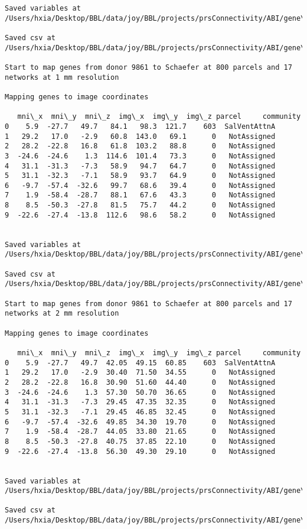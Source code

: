 \documentclass[11pt]{article}
\begin{document}
\begin{Verbatim}[commandchars=\\\{\}]
Saved variables at /Users/hxia/Desktop/BBL/data/joy/BBL/projects/prsConnectivity/ABI/gene\_mapping/9861donor\_800Parcels\_7Network\_2mm.pkl

Saved csv at /Users/hxia/Desktop/BBL/data/joy/BBL/projects/prsConnectivity/ABI/gene\_mapping/9861donor\_800Parcels\_7Network\_2mm.csv

Start to map genes from donor 9861 to Schaefer at 800 parcels and 17 networks at 1 mm resolution

Mapping genes to image coordinates

   mni\_x  mni\_y  mni\_z  img\_x  img\_y  img\_z parcel     community
0    5.9  -27.7   49.7   84.1   98.3  121.7    603  SalVentAttnA
1   29.2   17.0   -2.9   60.8  143.0   69.1      0   NotAssigned
2   28.2  -22.8   16.8   61.8  103.2   88.8      0   NotAssigned
3  -24.6  -24.6    1.3  114.6  101.4   73.3      0   NotAssigned
4   31.1  -31.3   -7.3   58.9   94.7   64.7      0   NotAssigned
5   31.1  -32.3   -7.1   58.9   93.7   64.9      0   NotAssigned
6   -9.7  -57.4  -32.6   99.7   68.6   39.4      0   NotAssigned
7    1.9  -58.4  -28.7   88.1   67.6   43.3      0   NotAssigned
8    8.5  -50.3  -27.8   81.5   75.7   44.2      0   NotAssigned
9  -22.6  -27.4  -13.8  112.6   98.6   58.2      0   NotAssigned


Saved variables at /Users/hxia/Desktop/BBL/data/joy/BBL/projects/prsConnectivity/ABI/gene\_mapping/9861donor\_800Parcels\_17Network\_1mm.pkl

Saved csv at /Users/hxia/Desktop/BBL/data/joy/BBL/projects/prsConnectivity/ABI/gene\_mapping/9861donor\_800Parcels\_17Network\_1mm.csv

Start to map genes from donor 9861 to Schaefer at 800 parcels and 17 networks at 2 mm resolution

Mapping genes to image coordinates

   mni\_x  mni\_y  mni\_z  img\_x  img\_y  img\_z parcel     community
0    5.9  -27.7   49.7  42.05  49.15  60.85    603  SalVentAttnA
1   29.2   17.0   -2.9  30.40  71.50  34.55      0   NotAssigned
2   28.2  -22.8   16.8  30.90  51.60  44.40      0   NotAssigned
3  -24.6  -24.6    1.3  57.30  50.70  36.65      0   NotAssigned
4   31.1  -31.3   -7.3  29.45  47.35  32.35      0   NotAssigned
5   31.1  -32.3   -7.1  29.45  46.85  32.45      0   NotAssigned
6   -9.7  -57.4  -32.6  49.85  34.30  19.70      0   NotAssigned
7    1.9  -58.4  -28.7  44.05  33.80  21.65      0   NotAssigned
8    8.5  -50.3  -27.8  40.75  37.85  22.10      0   NotAssigned
9  -22.6  -27.4  -13.8  56.30  49.30  29.10      0   NotAssigned


Saved variables at /Users/hxia/Desktop/BBL/data/joy/BBL/projects/prsConnectivity/ABI/gene\_mapping/9861donor\_800Parcels\_17Network\_2mm.pkl

Saved csv at /Users/hxia/Desktop/BBL/data/joy/BBL/projects/prsConnectivity/ABI/gene\_mapping/9861donor\_800Parcels\_17Network\_2mm.csv


    \end{Verbatim}
\end{document}
